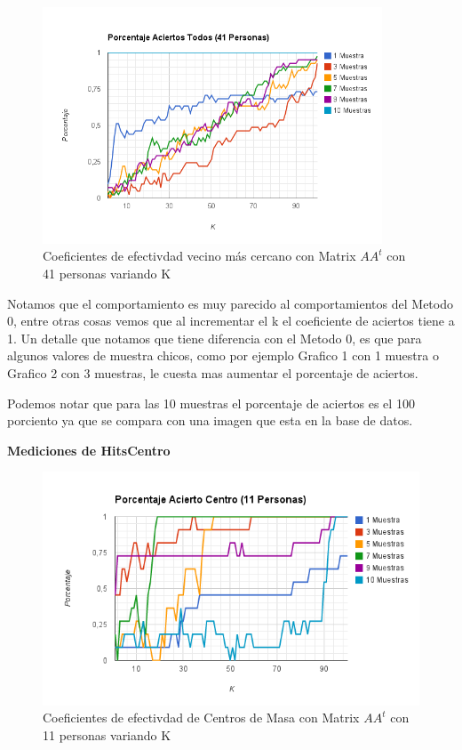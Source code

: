 \begin{figure}[H] \includegraphics[width=0.9\textwidth]{img/imagel.png} \caption{Coeficientes de
    efectivdad vecino más cercano con Matrix $AA^t$ con 41 personas variando K} \end{figure}

Notamos que el comportamiento es muy parecido al comportamientos del Metodo 0, entre otras cosas
vemos que al incrementar el k el coeficiente de aciertos tiene a 1.  Un detalle que notamos que
tiene diferencia con el Metodo 0, es que para algunos valores de muestra chicos, como por ejemplo
Grafico 1 con 1 muestra o Grafico 2 con 3 muestras, le cuesta mas aumentar el porcentaje de
aciertos.

Podemos notar  que para las 10 muestras el porcentaje de aciertos es el 100 porciento ya que se
compara con una imagen que esta en la base de datos.

\textbf{Mediciones de HitsCentro}

\begin{figure}[H] \includegraphics[width=1\textwidth]{img/imagem.png} \caption{Coeficientes de
    efectivdad de Centros de Masa con Matrix $AA^t$ con 11 personas variando K} \end{figure}


